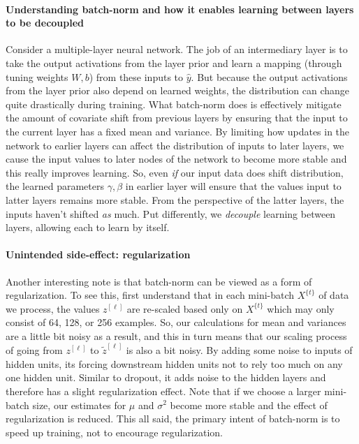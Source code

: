 \documentclass[12pt]{article}
\begin{document}
\paragraph{Understanding batch-norm and how it enables learning between layers to be decoupled}
Consider a multiple-layer neural network. The job of an intermediary layer is to take the output activations from the layer prior and learn a mapping (through tuning weights $W, b$) from these inputs to $\hat y$. But because the output activations from the layer prior also depend on learned weights, the distribution can change quite drastically during training. What batch-norm does is effectively mitigate the amount of covariate shift from previous layers by 
ensuring that the input to the current layer has a fixed mean and variance. By limiting how updates in the network to earlier layers can affect the distribution of inputs to later layers, we cause the input values to later nodes of the network to become more stable and this really improves learning. So, even \emph{if} our input data does shift distribution, the learned parameters $\gamma, \beta$ in earlier layer will ensure that the values input to latter layers remains more stable. From the perspective of the latter layers, the inputs haven't shifted \emph{as} much. 
Put differently, we \emph{decouple} learning between layers, allowing each to learn by itself. 

\paragraph{Unintended side-effect: regularization}
Another interesting note is that batch-norm can be viewed as a form of regularization. To see this, first understand
that in each mini-batch $X^{\{t\}}$ of data we process, the values $z^{[\ell]}$ are re-scaled based only on $X^{\{t\}}$
 which may only consist of 64, 128, or 256 examples. So, our calculations for mean and variances are a little 
bit noisy as a result, and this in turn means that our scaling process of going from $z^{[\ell]}$ to $\tilde z^{[\ell]}$ is also a bit noisy. By adding some noise to inputs of hidden units, its forcing downstream hidden units not to rely too much on any one hidden unit. Similar to dropout, it adds noise to the hidden layers and therefore has a slight regularization effect. Note that if we choose a larger mini-batch size, our estimates for $\mu$ and $\sigma^2$ become more stable and the effect of regularization is reduced. This all said, the primary intent of batch-norm is to 
speed up training, not to encourage regularization.
\end{document}
